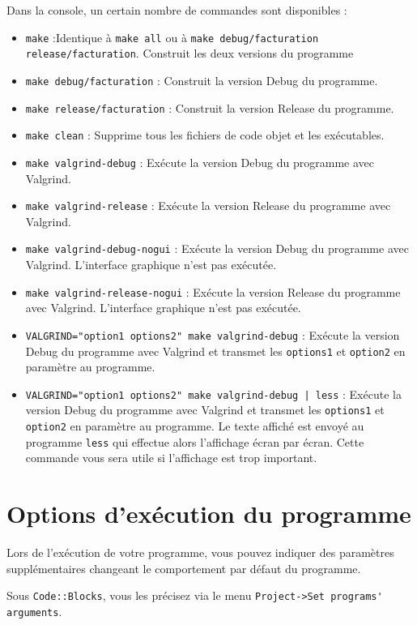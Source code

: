 Dans la console, un certain nombre de commandes sont disponibles :
\begin{itemize}
    \item \verb'make' :Identique à \verb'make all' ou à \verb'make debug/facturation release/facturation'. Construit les deux versions du programme
    \item \verb'make debug/facturation' : Construit la version Debug du programme.
    \item \verb'make release/facturation' : Construit la version Release du programme.
    \item \verb'make clean' : Supprime tous les fichiers de code objet et les exécutables.
    \item \verb'make valgrind-debug' : Exécute la version Debug du programme avec Valgrind.
    \item \verb'make valgrind-release' : Exécute la version Release du programme avec Valgrind.
    \item \verb'make valgrind-debug-nogui' : Exécute la version Debug du programme avec Valgrind. L'interface graphique n'est pas exécutée.
    \item \verb'make valgrind-release-nogui' : Exécute la version Release du programme avec Valgrind. L'interface graphique n'est pas exécutée.
    \item \verb'VALGRIND="option1 options2" make valgrind-debug' : Exécute la version Debug du programme avec Valgrind et transmet les \verb-options1- et \verb-option2- en paramètre au programme.
    \item \verb'VALGRIND="option1 options2" make valgrind-debug | less' : Exécute la version Debug du programme avec Valgrind et transmet les \verb-options1- et \verb-option2- en paramètre au programme. Le texte affiché est envoyé au programme \verb-less- qui effectue alors l'affichage écran par écran. Cette commande vous sera utile si l'affichage est trop important.
\end{itemize}

\section{Options d'exécution du programme}

Lors de l'exécution de votre programme, vous pouvez indiquer des paramètres supplémentaires changeant le comportement par défaut du programme. 
\begin{tipsandhints}
Sous \verb-Code::Blocks-, vous les précisez via le menu \verb~Project->Set programs' arguments~.
\end{tipsandhints}

